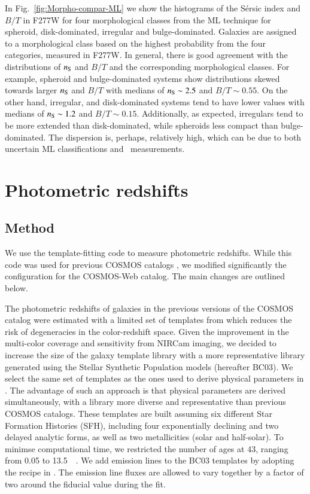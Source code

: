 \documentclass[longauth]{aa}
\begin{document}
In Fig.~\ref{fig:Morpho-compar-ML} we show the histograms of the S\'ersic index and $B/T$ in F277W for four morphological classes from the ML technique for  spheroid, disk-dominated, irregular and bulge-dominated. Galaxies are assigned to a morphological class based on the highest probability from the four categories, measured in F277W. In general, there is good agreement with the distributions of $n_{\rm S}$ and $B/T$ and the corresponding morphological classes. For example, spheroid and bulge-dominated systems show distributions skewed towards larger $n_{\rm S}$ and $B/T$ with medians of $n_{\rm S}\sim2.5$ and $B/T\sim0.55$. On the other hand, irregular, and disk-dominated systems tend to have lower values with medians of $n_{\rm S}\sim1.2$ and $B/T\sim0.15$. Additionally, as expected, irregulars tend to be more extended than disk-dominated, while spheroids less compact than bulge-dominated. The dispersion is, perhaps, relatively high, which can be due to both uncertain ML classifications and \SEpp\ measurements.



\section{Photometric redshifts} \label{sec:photo-z}

\subsection{Method} \label{sec:photoz-methods}

We use the template-fitting code \lephare{} \citep{arnouts_measuring_2002,ilbert_accurate_2006} to measure photometric redshifts. While this code was used for previous COSMOS catalogs \citep{laigle_cosmos2015_2016,weaver_cosmos2020_2022}, we modified significantly the configuration for the COSMOS-Web catalog. The main changes are outlined below. 

The photometric redshifts of galaxies in the previous versions of the COSMOS catalog were estimated with a limited set of templates from \citet{ilbert_mass_2013} which reduces the risk of degeneracies in the color-redshift space. Given the improvement in the multi-color coverage and sensitivity from NIRCam imaging, we decided to increase the size of the galaxy template library with a more representative library generated using the \citet{bruzual_stellar_2003} Stellar Synthetic Population models (hereafter BC03). We select the same set of templates as the ones used to derive physical parameters in \citet{ilbert_ssfr_2015}. The advantage of such an approach is that physical parameters are derived simultaneously, with a library more diverse and representative than previous COSMOS catalogs. These templates are built assuming six different Star Formation Histories (SFH), including four exponentially declining and two delayed analytic forms, as well as two metallicities (solar and half-solar). To minimse computational time, we restricted the number of ages at 43, ranging from 0.05 to \SI{13.5}{\giga\year}. We add emission lines to the BC03 templates by adopting the recipe in \citet{saito_EL-COSMOS_2020}. The emission line fluxes are allowed to vary together by a factor of two around the fiducial value during the fit.
\end{document}
